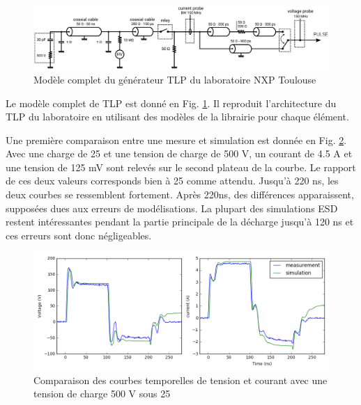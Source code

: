 \begin{figure}[!h]
  \centering
  \includegraphics[width=\textwidth]{src/1/figures/complete_nxp_tlp_model.pdf}
  \caption{Modèle complet du générateur TLP du laboratoire NXP Toulouse}
  \label{fig:complete-tlp-model}
\end{figure}

Le modèle complet de TLP est donné en Fig. \ref{fig:complete-tlp-model}.
Il reproduit l'architecture du TLP du laboratoire en utilisant des modèles de la librairie pour chaque élément.

Une première comparaison entre une mesure et simulation est donnée en Fig. \ref{fig:comparison-tlp-load}.
Avec une charge de 25\textOmega{} et une tension de charge de 500 V, un courant de 4.5 A et une tension de 125 mV sont relevés sur le second plateau de la courbe.
Le rapport de ces deux valeurs corresponds bien à 25\textOmega{} comme attendu.
Jusqu'à 220 ns, les deux courbes se ressemblent fortement.
Après 220ns, des différences apparaissent, supposées dues aux erreurs de modélisations.
La plupart des simulations ESD restent intéressantes pendant la partie principale de la décharge jusqu'à 120 ns et ces erreurs sont donc négligeables.

\begin{figure}[!h]
  \centering
  \includegraphics[width=\textwidth]{src/1/figures/tlp_comparison_R25_500V.png}
  \caption{Comparaison des courbes temporelles de tension et courant avec une  tension de charge 500 V sous 25\textOmega{}}
  \label{fig:comparison-tlp-load}
\end{figure}

